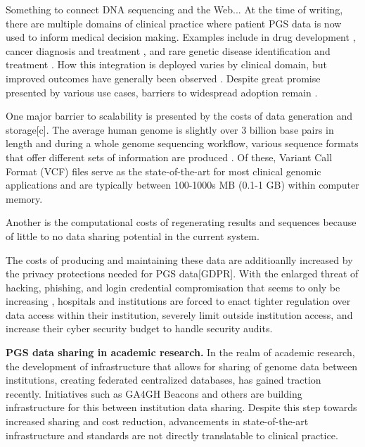 \documentclass[a4paper,11pt]{article}
\begin{document}
\begin{refsection}
Something to connect DNA sequencing and the Web...
At the time of writing, there are multiple domains of clinical practice where patient PGS data is now used to inform medical decision making. 
Examples include in drug development \cite{ko_new_2022}, cancer diagnosis and treatment \cite{mcleod_cancer_2013}, and rare genetic disease identification and treatment \cite{souche_recommendations_2022}.
How this integration is deployed varies by clinical domain, but improved outcomes have generally been observed \cite{mathur_personalized_2017}.
Despite great promise presented by various use cases, barriers to widespread adoption remain \cite{stefanicka-wojtas_barriers_2023}.

One major barrier to scalability is presented by the costs of data generation and storage[c].
The average human genome is slightly over 3 billion base pairs in length and during a whole genome sequencing workflow, various sequence formats that offer different sets of information are produced \cite{bagger_whole_2024}.
Of these, Variant Call Format (VCF) files \cite{danecek_variant_2011} serve as the state-of-the-art for most clinical genomic applications and are typically between 100-1000s MB (0.1-1 GB) within computer memory. 

Another is the computational costs of regenerating results and sequences because of little to no data sharing potential in the current system.

The costs of producing and maintaining these data are additioanlly increased by the privacy protections needed for PGS data[GDPR].
With the enlarged threat of hacking, phishing, and login credential compromisation that seems to only be increasing \cite{noauthor_ransomware_nodate}, hospitals and institutions are forced to enact tighter regulation over data access within their institution, severely limit outside institution access, and increase their cyber security budget to handle security audits.

\textbf{PGS data sharing in academic research.}
In the realm of academic research, the development of infrastructure that allows for sharing of genome data between institutions, creating federated centralized databases, has gained traction recently. 
Initiatives such as GA4GH Beacons \cite{rambla_beacon_2022} and others are building infrastructure for this between institution data sharing. 
Despite this step towards increased sharing and cost reduction, advancements in state-of-the-art infrastructure and standards are not directly translatable to clinical practice. 



\end{refsection}
\end{document}

